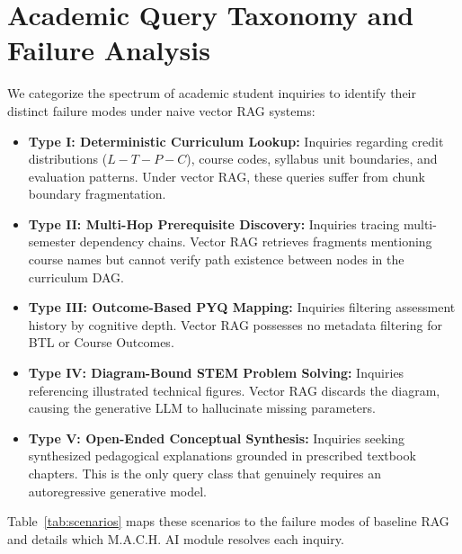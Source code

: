\documentclass[conference]{IEEEtran}
\begin{document}
\section{Academic Query Taxonomy and Failure Analysis}
We categorize the spectrum of academic student inquiries to identify their distinct failure modes under naive vector RAG systems:
\begin{itemize}
    \item \textbf{Type I: Deterministic Curriculum Lookup:} Inquiries regarding credit distributions ($L-T-P-C$), course codes, syllabus unit boundaries, and evaluation patterns. Under vector RAG, these queries suffer from chunk boundary fragmentation.
    \item \textbf{Type II: Multi-Hop Prerequisite Discovery:} Inquiries tracing multi-semester dependency chains. Vector RAG retrieves fragments mentioning course names but cannot verify path existence between nodes in the curriculum DAG.
    \item \textbf{Type III: Outcome-Based PYQ Mapping:} Inquiries filtering assessment history by cognitive depth. Vector RAG possesses no metadata filtering for BTL or Course Outcomes.
    \item \textbf{Type IV: Diagram-Bound STEM Problem Solving:} Inquiries referencing illustrated technical figures. Vector RAG discards the diagram, causing the generative LLM to hallucinate missing parameters.
    \item \textbf{Type V: Open-Ended Conceptual Synthesis:} Inquiries seeking synthesized pedagogical explanations grounded in prescribed textbook chapters. This is the only query class that genuinely requires an autoregressive generative model.
\end{itemize}

Table~\ref{tab:scenarios} maps these scenarios to the failure modes of baseline RAG and details which M.A.C.H. AI module resolves each inquiry.

\begin{table}[htbp]
\caption{Query Scenarios, Baseline RAG Failure Modes, and M.A.C.H. AI Resolution Matrix}
\label{tab:scenarios}
\centering
{}
\end{table}
\end{document}

